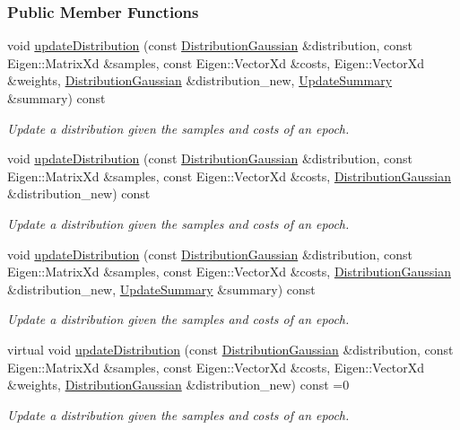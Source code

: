 \subsubsection*{Public Member Functions}
\begin{DoxyCompactItemize}
\item 
void \hyperlink{classDmpBbo_1_1Updater_ae57a9f8264e9a9689fd21ef99c623227}{update\+Distribution} (const \hyperlink{classDmpBbo_1_1DistributionGaussian}{Distribution\+Gaussian} \&distribution, const Eigen\+::\+Matrix\+Xd \&samples, const Eigen\+::\+Vector\+Xd \&costs, Eigen\+::\+Vector\+Xd \&weights, \hyperlink{classDmpBbo_1_1DistributionGaussian}{Distribution\+Gaussian} \&distribution\+\_\+new, \hyperlink{classDmpBbo_1_1UpdateSummary}{Update\+Summary} \&summary) const 
\begin{DoxyCompactList}\small\item\em Update a distribution given the samples and costs of an epoch. \end{DoxyCompactList}\item 
void \hyperlink{classDmpBbo_1_1Updater_a9f3c0a24eb032b84b724a19deb77efd8}{update\+Distribution} (const \hyperlink{classDmpBbo_1_1DistributionGaussian}{Distribution\+Gaussian} \&distribution, const Eigen\+::\+Matrix\+Xd \&samples, const Eigen\+::\+Vector\+Xd \&costs, \hyperlink{classDmpBbo_1_1DistributionGaussian}{Distribution\+Gaussian} \&distribution\+\_\+new) const 
\begin{DoxyCompactList}\small\item\em Update a distribution given the samples and costs of an epoch. \end{DoxyCompactList}\item 
void \hyperlink{classDmpBbo_1_1Updater_a4b660190fb18615402cbff5ececf9c2b}{update\+Distribution} (const \hyperlink{classDmpBbo_1_1DistributionGaussian}{Distribution\+Gaussian} \&distribution, const Eigen\+::\+Matrix\+Xd \&samples, const Eigen\+::\+Vector\+Xd \&costs, \hyperlink{classDmpBbo_1_1DistributionGaussian}{Distribution\+Gaussian} \&distribution\+\_\+new, \hyperlink{classDmpBbo_1_1UpdateSummary}{Update\+Summary} \&summary) const 
\begin{DoxyCompactList}\small\item\em Update a distribution given the samples and costs of an epoch. \end{DoxyCompactList}\item 
virtual void \hyperlink{classDmpBbo_1_1Updater_ac7a91b073fbe6e73a10c14fb73bd9689}{update\+Distribution} (const \hyperlink{classDmpBbo_1_1DistributionGaussian}{Distribution\+Gaussian} \&distribution, const Eigen\+::\+Matrix\+Xd \&samples, const Eigen\+::\+Vector\+Xd \&costs, Eigen\+::\+Vector\+Xd \&weights, \hyperlink{classDmpBbo_1_1DistributionGaussian}{Distribution\+Gaussian} \&distribution\+\_\+new) const =0
\begin{DoxyCompactList}\small\item\em Update a distribution given the samples and costs of an epoch. \end{DoxyCompactList}\end{DoxyCompactItemize}
